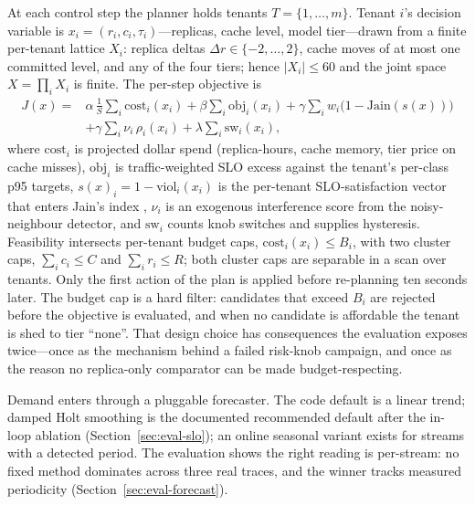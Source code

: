 At each control step the planner holds tenants $T = \{1,\dots,m\}$. Tenant
$i$'s decision variable is $x_i = (r_i, c_i, \tau_i)$---replicas, cache
level, model tier---drawn from a finite per-tenant lattice $X_i$: replica
deltas $\Delta r \in \{-2,\dots,2\}$, cache moves of at most one committed
level, and any of the four tiers; hence $|X_i| \le 60$ and the joint space
$X = \prod_i X_i$ is finite. The per-step objective is
\begin{equation}
\label{eq:objective}
\begin{split}
J(x) = {}& \alpha\,\frac{1}{S}\sum_i \mathrm{cost}_i(x_i)
        + \beta \sum_i \mathrm{obj}_i(x_i)
        + \gamma \sum_i w_i \bigl(1 - \mathrm{Jain}(s(x))\bigr) \\
       & + \gamma \sum_i \nu_i\,\rho_i(x_i)
        + \lambda \sum_i \mathrm{sw}_i(x_i),
\end{split}
\end{equation}
where $\mathrm{cost}_i$ is projected dollar spend (replica-hours, cache
memory, tier price on cache misses), $\mathrm{obj}_i$ is traffic-weighted
SLO excess against the tenant's per-class p95 targets, $s(x)_i = 1 -
\mathrm{viol}_i(x_i)$ is the per-tenant SLO-satisfaction vector that enters
Jain's index \citep{jain1984}, $\nu_i$ is an exogenous interference score
from the noisy-neighbour detector, and $\mathrm{sw}_i$ counts knob switches
and supplies hysteresis. Feasibility intersects per-tenant budget caps,
$\mathrm{cost}_i(x_i) \le B_i$, with two cluster caps, $\sum_i c_i \le C$
and $\sum_i r_i \le R$; both cluster caps are separable in a scan over
tenants. Only the first action of the plan is applied before re-planning
ten seconds later. The budget cap is a hard filter: candidates that exceed
$B_i$ are rejected before the objective is evaluated, and when no candidate
is affordable the tenant is shed to tier ``none''. That design choice has
consequences the evaluation exposes twice---once as the mechanism behind a
failed risk-knob campaign, and once as the reason no replica-only
comparator can be made budget-respecting.

Demand enters through a pluggable forecaster. The code default is a linear
trend; damped Holt smoothing \citep{holt2004} is the documented recommended
default after the in-loop ablation (Section~\ref{sec:eval-slo}); an online
seasonal variant exists for streams with a detected period. The evaluation
shows the right reading is per-stream: no fixed method dominates across
three real traces, and the winner tracks measured periodicity
(Section~\ref{sec:eval-forecast}).


